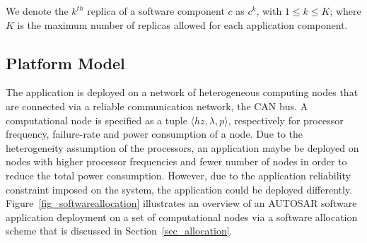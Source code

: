 We denote the $k^{th}$ replica of a software component $c$ as $c^k$, with $1\le k\leq K$; where $K$ is the maximum number of replicas allowed for each application component.

\subsection{Platform Model}
The application is deployed on a network of heterogeneous computing nodes that are connected via a reliable communication network, the CAN bus. A computational node is specified as a tuple $\langle hz, \lambda, p \rangle$, respectively for processor frequency, failure-rate and power consumption of a node. Due to the heterogeneity assumption of the processors, an application maybe be deployed on nodes with higher processor frequencies and fewer number of nodes in order to reduce the total power consumption. However, due to the application reliability constraint imposed on the system, the application could be deployed differently. Figure~\ref{fig_softwareallocation} illustrates an overview of an AUTOSAR software application deployment on a set of computational nodes via a software allocation scheme that is discussed in Section~\ref{sec_allocation}.

